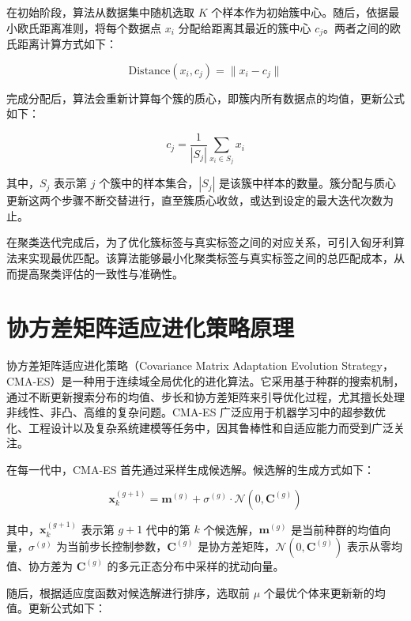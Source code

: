 \documentclass[master]{thesis-uestc}
\begin{document}
在初始阶段，算法从数据集中随机选取 \(K\) 个样本作为初始簇中心。随后，依据最小欧氏距离准则，将每个数据点 \(x_i\) 分配给距离其最近的簇中心 \(c_j\)。两者之间的欧氏距离计算方式如下：

\begin{equation}
\text{Distance}(x_i, c_j) = \| x_i - c_j \|
\end{equation}

完成分配后，算法会重新计算每个簇的质心，即簇内所有数据点的均值，更新公式如下：

\begin{equation}
c_j = \frac{1}{|S_j|} \sum_{x_i \in S_j} x_i
\end{equation}

其中，\(S_j\) 表示第 \(j\) 个簇中的样本集合，\(|S_j|\) 是该簇中样本的数量。簇分配与质心更新这两个步骤不断交替进行，直至簇质心收敛，或达到设定的最大迭代次数为止。

在聚类迭代完成后，为了优化簇标签与真实标签之间的对应关系，可引入匈牙利算法来实现最优匹配。该算法能够最小化聚类标签与真实标签之间的总匹配成本，从而提高聚类评估的一致性与准确性。
\FloatBarrier  %


\section{协方差矩阵适应进化策略原理}
协方差矩阵适应进化策略（Covariance Matrix Adaptation Evolution Strategy，CMA-ES）是一种用于连续域全局优化的进化算法。它采用基于种群的搜索机制，通过不断更新搜索分布的均值、步长和协方差矩阵来引导优化过程，尤其擅长处理非线性、非凸、高维的复杂问题。CMA-ES 广泛应用于机器学习中的超参数优化、工程设计以及复杂系统建模等任务中，因其鲁棒性和自适应能力而受到广泛关注。

在每一代中，CMA-ES 首先通过采样生成候选解。候选解的生成方式如下：

\begin{equation}
\mathbf{x}_k^{(g+1)} = \mathbf{m}^{(g)} + \sigma^{(g)} \cdot \mathcal{N}(0, \mathbf{C}^{(g)})
\label{eq:sample}
\end{equation}

其中，\(\mathbf{x}_k^{(g+1)}\) 表示第 \(g+1\) 代中的第 \(k\) 个候选解，\(\mathbf{m}^{(g)}\) 是当前种群的均值向量，\(\sigma^{(g)}\) 为当前步长控制参数，\(\mathbf{C}^{(g)}\) 是协方差矩阵，\(\mathcal{N}(0, \mathbf{C}^{(g)})\) 表示从零均值、协方差为 \(\mathbf{C}^{(g)}\) 的多元正态分布中采样的扰动向量。

随后，根据适应度函数对候选解进行排序，选取前 \(\mu\) 个最优个体来更新新的均值。更新公式如下：
\end{document}
